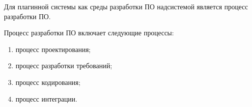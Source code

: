 Для плагинной системы как среды разработки ПО надсистемой является процесс разработки ПО.

Процесс разработки ПО включает следующие процессы:
\begin{enumerate}
    \item процесс проектирования;
    \item процесс разработки требований;
    \item процесс кодирования;
    \item процесс интеграции.
\end{enumerate}
